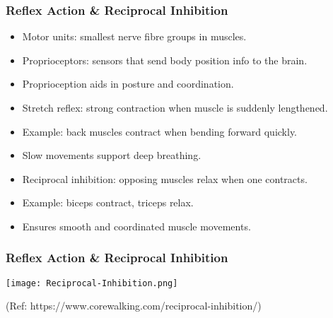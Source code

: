 \begin{frame}[fragile]\frametitle{Reflex Action \& Reciprocal Inhibition}

      \begin{itemize}
		\item Motor units: smallest nerve fibre groups in muscles.
		\item Proprioceptors: sensors that send body position info to the brain.
		\item Proprioception aids in posture and coordination.
		\item Stretch reflex: strong contraction when muscle is suddenly lengthened.
		\item Example: back muscles contract when bending forward quickly.
		\item Slow movements support deep breathing.
		\item Reciprocal inhibition: opposing muscles relax when one contracts.
		\item Example: biceps contract, triceps relax.
		\item Ensures smooth and coordinated muscle movements.
	  \end{itemize}

\end{frame}



\begin{frame}[fragile]\frametitle{Reflex Action \& Reciprocal Inhibition}

		\begin{center}
		\texttt{[image: Reciprocal-Inhibition.png]}
		
						
		{\tiny (Ref: https://www.corewalking.com/reciprocal-inhibition/)}
		\end{center}	

\end{frame}

